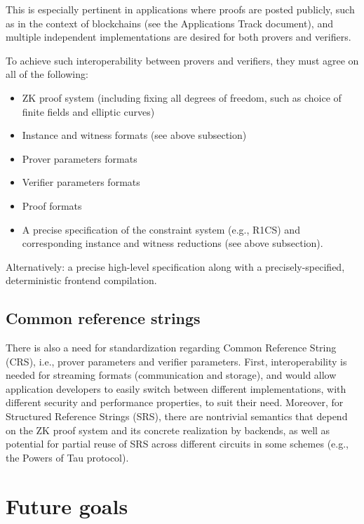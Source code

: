 This is especially pertinent in applications where proofs are posted publicly, such as in the context of blockchains (see the Applications Track document), and multiple independent implementations are desired for both provers and verifiers.

To achieve such interoperability between provers and verifiers, they must agree on all of the following:
\begin{itemize}
    \item ZK proof system (including fixing all degrees of freedom, such as choice of finite fields and elliptic curves)
    \item Instance and witness formats (see above subsection)
    \item Prover parameters formats
    \item Verifier parameters formats
    \item Proof formats
    \item A precise specification of the constraint system (e.g., R1CS) and corresponding instance and witness reductions (see above subsection).
\end{itemize}

Alternatively: a precise high-level specification along with a precisely-specified, deterministic frontend compilation.


\subsection{Common reference strings}
There is also a need for standardization regarding Common Reference String (CRS), i.e., prover parameters and verifier parameters. First, interoperability is needed for streaming formats (communication and storage), and would allow application developers to easily switch between different implementations, with different security and performance properties, to suit their need. Moreover, for Structured Reference Strings (SRS), there are nontrivial semantics that depend on the ZK proof system and its concrete realization by backends, as well as potential for partial reuse of SRS across different circuits in some schemes (e.g., the Powers of Tau protocol). 


\section{Future goals}


